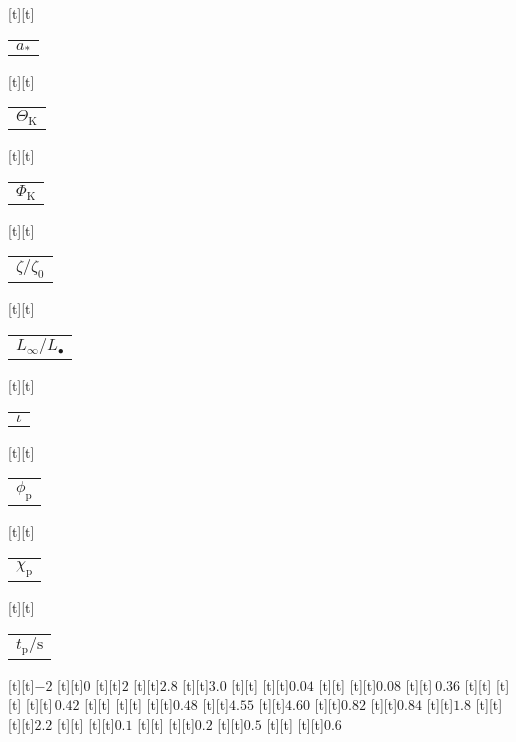 \begin{psfrags}
[t][t]{\color[rgb]{0,0,0}\setlength{\tabcolsep}{0pt}\begin{tabular}{c}{$a_\ast$}\end{tabular}}%
[t][t]{\color[rgb]{0,0,0}\setlength{\tabcolsep}{0pt}\begin{tabular}{c}{$\Theta_\mathrm{K}$}\end{tabular}}%
[t][t]{\color[rgb]{0,0,0}\setlength{\tabcolsep}{0pt}\begin{tabular}{c}{$\Phi_\mathrm{K}$}\end{tabular}}%
[t][t]{\color[rgb]{0,0,0}\setlength{\tabcolsep}{0pt}\begin{tabular}{c}{$\zeta/\zeta_0$}\end{tabular}}%
[t][t]{\color[rgb]{0,0,0}\setlength{\tabcolsep}{0pt}\begin{tabular}{c}{$L_\infty/L_\bullet$}\end{tabular}}%
[t][t]{\color[rgb]{0,0,0}\setlength{\tabcolsep}{0pt}\begin{tabular}{c}{$\iota$}\end{tabular}}%
[t][t]{\color[rgb]{0,0,0}\setlength{\tabcolsep}{0pt}\begin{tabular}{c}{$\phi_\mathrm{p}$}\end{tabular}}%
[t][t]{\color[rgb]{0,0,0}\setlength{\tabcolsep}{0pt}\begin{tabular}{c}{$\chi_\mathrm{p}$}\end{tabular}}%
[t][t]{\color[rgb]{0,0,0}\setlength{\tabcolsep}{0pt}\begin{tabular}{c}{$t_\mathrm{p}/\mathrm{s}$}\end{tabular}}%
%
[t][t]{$-2$}%
[t][t]{$0$}%
[t][t]{$2$}%
[t][t]{$2.8$}%
[t][t]{$3.0$}%
[t][t]{}%
[t][t]{$0.04$}%
[t][t]{}%
[t][t]{$0.08$}%
[t][t]{$\ 0.36$}%
[t][t]{}%
[t][t]{}%
[t][t]{$\,0.42$}%
[t][t]{}%
[t][t]{}%
[t][t]{$0.48$}%
[t][t]{$4.55$}%
[t][t]{$4.60$}%
[t][t]{$0.82$}%
[t][t]{$0.84$}%
[t][t]{$1.8$}%
[t][t]{}%
[t][t]{$2.2$}%
[t][t]{}%
[t][t]{$0.1$}%
[t][t]{}%
[t][t]{$0.2$}%
[t][t]{$0.5$}%
[t][t]{}%
[t][t]{$0.6$}%

\end{psfrags}
